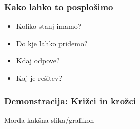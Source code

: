 \documentclass{beamer}    %
\begin{document}
\begin{frame}
    \frametitle{Kako lahko to posplošimo}
    \begin{itemize}
        \item Koliko stanj imamo?
        \item Do kje lahko pridemo?
        \item Kdaj odpove?
        \item Kaj je rešitev?
    \end{itemize}
\end{frame}


%    


\begin{frame}
    \frametitle{Demonstracija: Križci in krožci}
    Morda kakšna slika/grafikon
\end{frame}


\end{document}
